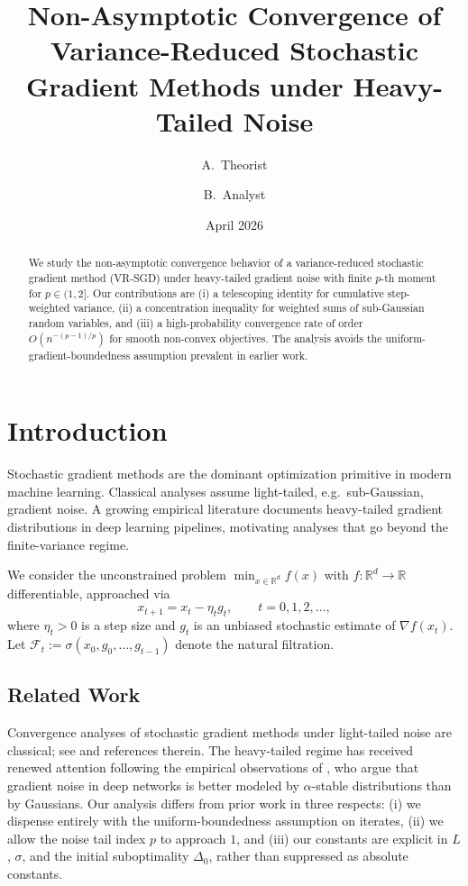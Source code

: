 \documentclass[11pt]{article}
\title{Non-Asymptotic Convergence of Variance-Reduced Stochastic\\ Gradient Methods under Heavy-Tailed Noise}
\author{A.\ Theorist \and B.\ Analyst}
\date{April 2026}
\theoremstyle{definition}
\newcommand{\RR}{\mathbb{R}}
\begin{document}
\maketitle

\begin{abstract}
We study the non-asymptotic convergence behavior of a variance-reduced stochastic gradient method (VR-SGD) under heavy-tailed gradient noise with finite $p$-th moment for $p \in (1, 2]$. Our contributions are (i) a telescoping identity for cumulative step-weighted variance, (ii) a concentration inequality for weighted sums of sub-Gaussian random variables, and (iii) a high-probability convergence rate of order $O(n^{-(p-1)/p})$ for smooth non-convex objectives. The analysis avoids the uniform-gradient-boundedness assumption prevalent in earlier work.
\end{abstract}

\section{Introduction}

Stochastic gradient methods are the dominant optimization primitive in modern machine learning. Classical analyses assume light-tailed, e.g.\ sub-Gaussian, gradient noise. A growing empirical literature \citep{zhang2020adaptive, gurbuzbalaban2021heavy} documents heavy-tailed gradient distributions in deep learning pipelines, motivating analyses that go beyond the finite-variance regime.

We consider the unconstrained problem $\min_{x \in \RR^d} f(x)$ with $f : \RR^d \to \RR$ differentiable, approached via
\begin{equation}\label{eq:sgd}
x_{t+1} = x_t - \eta_t g_t, \qquad t = 0, 1, 2, \ldots,
\end{equation}
where $\eta_t > 0$ is a step size and $g_t$ is an unbiased stochastic estimate of $\nabla f(x_t)$. Let $\mathcal{F}_t := \sigma(x_0, g_0, \ldots, g_{t-1})$ denote the natural filtration.

\subsection{Related Work}

Convergence analyses of stochastic gradient methods under light-tailed noise are classical; see \citet{zhang2020adaptive} and references therein. The heavy-tailed regime has received renewed attention following the empirical observations of \citet{gurbuzbalaban2021heavy}, who argue that gradient noise in deep networks is better modeled by $\alpha$-stable distributions than by Gaussians. Our analysis differs from prior work in three respects: (i) we dispense entirely with the uniform-boundedness assumption on iterates, (ii) we allow the noise tail index $p$ to approach $1$, and (iii) our constants are explicit in $L$, $\sigma$, and the initial suboptimality $\Delta_0$, rather than suppressed as absolute constants.
\end{document}
